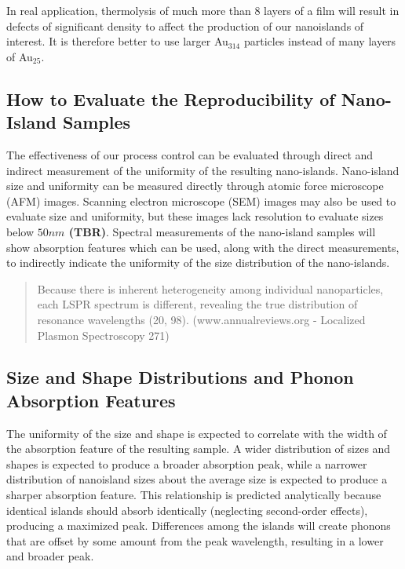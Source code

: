 \documentclass[12pt,oneside,english]{article}
\begin{document}
	In real application, thermolysis of much more than 8 layers of a film will result in defects of significant density to affect the production of our nanoislands of interest.
	It is therefore better to use larger Au$_{314}$ particles instead of many layers of Au$_{25}$.


	\subsection{How to Evaluate the Reproducibility of Nano-Island Samples}
	The effectiveness of our process control can be evaluated through direct and indirect measurement of the uniformity of the resulting nano-islands.  
	Nano-island size and uniformity can be measured directly through atomic force microscope (AFM) images.  
	Scanning electron microscope (SEM) images may also be used to evaluate size and uniformity, but these images lack resolution to evaluate sizes below {\bf $50nm$ (TBR)}.  
	Spectral measurements of the nano-island samples will show absorption features which can be used, along with the direct measurements, to indirectly indicate the uniformity of the size distribution of the nano-islands.
	
	\begin{quote}
		Because there is inherent heterogeneity among individual nanoparticles, each LSPR spectrum is different, revealing the true distribution of resonance wavelengths (20, 98).		
		(www.annualreviews.org - Localized Plasmon Spectroscopy
	271)
	\end{quote}


	\subsection{Size and Shape Distributions and Phonon Absorption Features}
	The uniformity of the size and shape is expected to correlate with the width of the absorption feature of the resulting sample.
	A wider distribution of sizes and shapes is expected to produce a broader absorption peak, while a narrower distribution of nanoisland sizes about the average size is expected to produce a sharper absorption feature.
	This relationship is predicted analytically because identical islands should absorb identically (neglecting second-order effects), producing a maximized peak.  
	Differences among the islands will create phonons that are offset by some amount from the peak wavelength, resulting in a lower and broader peak.
	
		
	
\end{document}
